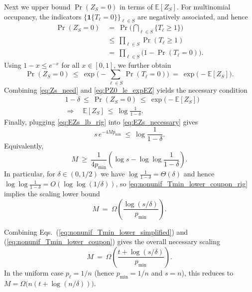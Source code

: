 \documentclass[aps,prx,reprint,superscriptaddress,amsmath,amssymb,longbibliography,floatfix]{revtex4-2}
\newcommand{\dsE}{\mathbb{E}}
\theoremstyle{plain}
\theoremstyle{definition}
\theoremstyle{remark}
\begin{document}
Next we upper bound $\Pr(Z_S=0)$ in terms of $\dsE[Z_S]$.
For multinomial occupancy, the indicators $\{\mathbf{1}\{T_\ell=0\}\}_{\ell\in S}$
are negatively associated, and hence
\begin{equation}
\begin{aligned}
\Pr(Z_S=0)
    &\ =\ \Pr\Big(\bigcap_{\ell\in S}\{T_\ell\ge 1\}\Big)\\
    &\ \le\ \prod_{\ell\in S}\Pr(T_\ell\ge 1)\\
    &\ =\ \prod_{\ell\in S}\big(1-\Pr(T_\ell=0)\big).
    \label{eq:neg_assoc_step}
\end{aligned}
\end{equation}
Using $1-x\le e^{-x}$ for all $x\in[0,1]$, we further obtain
\begin{equation}
    \Pr(Z_S=0)
    \ \le\ \exp\!\Big(-\sum_{\ell\in S}\Pr(T_\ell=0)\Big)
    \ =\ \exp\!\big(-\dsE[Z_S]\big).
    \label{eq:PZ0_le_expEZ}
\end{equation}
Combining \eqref{eq:Zs_need} and \eqref{eq:PZ0_le_expEZ} yields the necessary condition
\begin{equation}
\begin{aligned}
&1-\delta\ \le\ \Pr(Z_S=0)\ \le\ \exp\!\big(-\dsE[Z_S]\big)
    \\
    &\Longrightarrow\quad
    \dsE[Z_S]\ \le\ \log\frac{1}{1-\delta}.
    \label{eq:EZs_necessary}
\end{aligned}
\end{equation}
Finally, plugging \eqref{eq:EZs_lb_rig} into \eqref{eq:EZs_necessary} gives
\begin{equation*}
    s\,e^{-4Mp_{\min}}
    \ \le\ \log\frac{1}{1-\delta}.
\end{equation*}
Equivalently,
\begin{equation}
    M\ \ge\ \frac{1}{4p_{\min}}
    \left(\log s-\log\log\frac{1}{1-\delta}\right).
    \label{eq:nonunif_Tmin_lower_coupon_rig}
\end{equation}
In particular, for $\delta\in(0,1/2)$ we have $\log\frac{1}{1-\delta}=\Theta(\delta)$ and hence
$\log\log\frac{1}{1-\delta}=O(\log\log(1/\delta))$, so \eqref{eq:nonunif_Tmin_lower_coupon_rig}
implies the scaling lower bound
\begin{equation}
    M\ =\ \Omega\!\left(\frac{\log(s/\delta)}{p_{\min}}\right).
    \label{eq:nonunif_Tmin_lower_coupon}
\end{equation}

Combining Eqs.~(\ref{eq:nonunif_Tmin_lower_simplified}) and (\ref{eq:nonunif_Tmin_lower_coupon})
gives the overall necessary scaling
\begin{equation}
    M\ =\ \Omega\!\left(\frac{t+\log(s/\delta)}{p_{\min}}\right).
\label{eq:app-occupancy-combined-necessary-scaling}
\end{equation}
In the uniform case $p_\ell=1/n$ (hence $p_{\min}=1/n$ and $s=n$), this reduces to
$M=\Omega\!\big(n(t+\log(n/\delta))\big)$.
\end{document}
